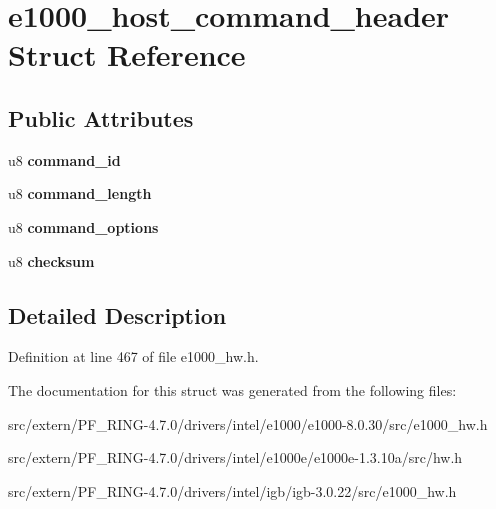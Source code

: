 \hypertarget{structe1000__host__command__header}{
\section{e1000\_\-host\_\-command\_\-header Struct Reference}
\label{structe1000__host__command__header}
}
\subsection*{Public Attributes}
\begin{DoxyCompactItemize}
\item 
\hypertarget{structe1000__host__command__header_a426956182ad1d71ad8bf4205b8e9c2cd}{
u8 {\bfseries command\_\-id}}
\label{structe1000__host__command__header_a426956182ad1d71ad8bf4205b8e9c2cd}

\item 
\hypertarget{structe1000__host__command__header_a2683f5f6eb8119f4a1c6c6b003123c06}{
u8 {\bfseries command\_\-length}}
\label{structe1000__host__command__header_a2683f5f6eb8119f4a1c6c6b003123c06}

\item 
\hypertarget{structe1000__host__command__header_a81720340820b1997a2ba02363d6bd60e}{
u8 {\bfseries command\_\-options}}
\label{structe1000__host__command__header_a81720340820b1997a2ba02363d6bd60e}

\item 
\hypertarget{structe1000__host__command__header_a9df0e25f656a1ec7dc653798c6a9f2b0}{
u8 {\bfseries checksum}}
\label{structe1000__host__command__header_a9df0e25f656a1ec7dc653798c6a9f2b0}

\end{DoxyCompactItemize}


\subsection{Detailed Description}


Definition at line 467 of file e1000\_\-hw.h.



The documentation for this struct was generated from the following files:\begin{DoxyCompactItemize}
\item 
src/extern/PF\_\-RING-\/4.7.0/drivers/intel/e1000/e1000-\/8.0.30/src/e1000\_\-hw.h\item 
src/extern/PF\_\-RING-\/4.7.0/drivers/intel/e1000e/e1000e-\/1.3.10a/src/hw.h\item 
src/extern/PF\_\-RING-\/4.7.0/drivers/intel/igb/igb-\/3.0.22/src/e1000\_\-hw.h\end{DoxyCompactItemize}

